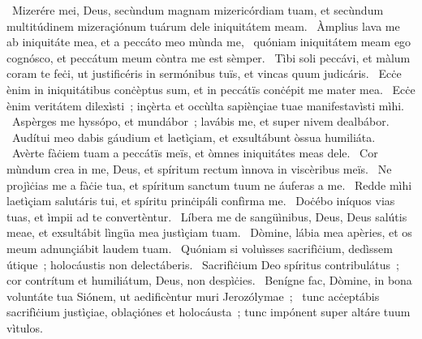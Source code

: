 ~Mizerére mei, Deus, secùndum magnam mizericórdiam tuam, et secùndum multitúdinem mizeraçiónum tuárum dele iniquitátem meam. 
~Àmplius lava me ab iniquitáte mea, et a peccáto meo mùnda me, 
~quóniam iniquitátem meam ego cognósco, et peccátum meum còntra me est sèmper. 
~Tìbi soli peccávi, et màlum coram te feċi, ut justificéris in sermónibus tuïs, et vincas quum judicáris. 
~Ecċe ènim in iniquitátibus conċèptus sum, et in peccátïs conċépit me mater mea. 
~Ecċe ènim veritátem dilexìsti~; inçèrta et occùlta sapiènçiae tuae manifestavìsti mìhi. 
~Aspèrges me hyssópo, et mundábor~; lavábis me, et super nivem dealbábor. 
~Audítui meo dabis gáudium et laetìçiam, et exsultábunt òssua humiliáta. 
~Avèrte fàċiem tuam a peccátïs meïs, et òmnes iniquitátes meas dele. 
~Cor mùndum crea in me, Deus, et spíritum rectum ìnnova in viscèribus meïs. 
~Ne projìċias me a fàċie tua, et spíritum sanctum tuum ne áuferas a me. 
~Redde mìhi laetìçiam salutáris tui, et spíritu prinċipáli confìrma me. 
~Doċébo iníquos vias tuas, et ìmpii ad te convertèntur. 
~Líbera me de sangüìnibus, Deus, Deus salútis meae, et exsultábit lìngüa mea justìçiam tuam. 
~Dòmine, lábia mea apèries, et os meum adnunçiábit laudem tuam. 
~Quóniam si voluìsses sacrifìċium, dedìssem útique~; holocáustis non delectáberis. 
~Sacrifìċium Deo spíritus contribulátus~; cor contrítum et humiliátum, Deus, non despìċies. 
~Benígne fac, Dòmine, in bona voluntáte tua Siónem, ut aedificèntur muri Jerozólymae~; 
~tunc acċeptábis sacrifìċium justìçiae, oblaçiónes et holocáusta~; tunc impónent super altáre tuum vìtulos. 
